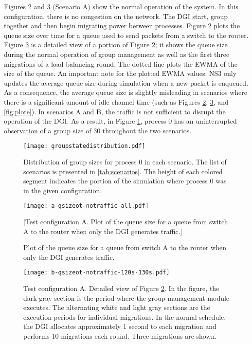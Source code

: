 Figures \ref{fig:plota} and \ref{fig:plotb} (Scenario A) show the normal operation of the system.
In this configuration, there is no congestion on the network. 
The \ac{DGI} start, group together and then begin migrating power between processes.
Figure \ref{fig:plota} plots the queue size over time for a queue used to send packets from a switch to the router.
Figure \ref{fig:plotb} is a detailed view of a portion of Figure \ref{fig:plota};
it shows the queue size during the normal operation of group management as well as the first three migrations of a load balancing round.
The dotted line plots the \ac{EWMA} of the size of the queue.
An important note for the plotted \ac{EWMA} values: \ac{NS3} only updates the average queue size during simulation when a new packet is enqueued.
As a consequence, the average queue size is slightly misleading in scenarios where there is a significant amount of idle channel time (such as Figures \ref{fig:plota}, \ref{fig:plotb}, and \ref{fig:plote}).
In scenarios A and B, the traffic is not sufficient to disrupt the operation of the DGI.
As a result, in Figure \ref{fig:groupstatedistro}, process 0 has an uninterrupted observation of a group size of 30 throughout the two scenarios.

\begin{figure}
\centering
\texttt{[image: groupstatedistribution.pdf]}
\caption[Distribution of group sizes for process 0 in each scenario.]{Distribution of group sizes for process 0 in each scenario. The list of scenarios is presented in \ref{tab:scenarios}.  The height of each colored segment indicates the portion of the simulation where process 0 was in the given configuration.}
\label{fig:groupstatedistro}
\end{figure}

\begin{figure}
\centering
\texttt{[image: a-qsizeot-notraffic-all.pdf]}
\caption{Plot of the queue size for a queue from switch A to the router when only the DGI generates traffic.}[Test configuration A. Plot of the queue size for a queue from switch A to the router when only the DGI generates traffic.]
\label{fig:plota}
\end{figure}

\begin{figure}
\centering
\texttt{[image: b-qsizeot-notraffic-120s-130s.pdf]}
\caption[Detailed view of Figure \ref{fig:plota}.]{
    Test configuration A.
Detailed view of Figure \ref{fig:plota}. In the figure, the dark gray section is the period where the group management module executes.
The alternating white and light gray sections are the execution periods for individual migrations.
In the normal schedule, the DGI allocates approximately 1 second to each migration and performs 10 migrations each round.
Three migrations are shown.}
\label{fig:plotb}
\end{figure}

